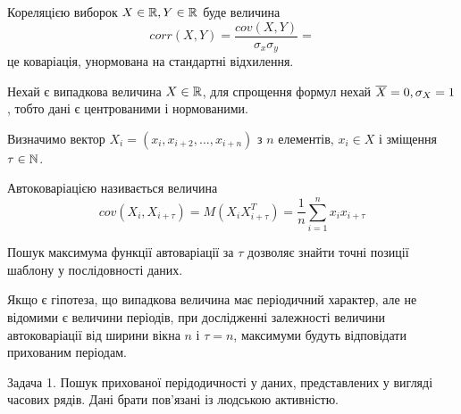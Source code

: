 \begin{ozn}
Кореляцією виборок $X \in \Bbb R, Y \in \Bbb R$ буде величина
\begin{equation}
corr(X,Y) = \frac{cov(X,Y)}{\sigma_x \sigma_y} = 
\end{equation}
це коваріація, унормована на стандартні відхилення.
\end{ozn}

Нехай є випадкова величина $X \in \Bbb R$, для спрощення формул нехай $\overline{X} = 0, \sigma_X = 1$, тобто дані є центрованими і нормованими. 

Визначимо вектор $X_i = (x_i, x_{i+2}, \ldots, x_{i+n}) $ з $n$ елементів, $ x_i \in X$ і зміщення $\tau \in \Bbb N$.

\begin{ozn}
Автоковаріацією називається величина 
\begin{equation}
cov(X_i, X_{i+\tau}) = M(X_iX_{i+\tau}^T) = \frac{1}{n} \sum_{i = 1}^{n} x_i x_{i+\tau}
\end{equation}
\end{ozn}

Пошук максимума функції автоваріації за $\tau$ дозволяє знайти точні позиції шаблону у послідовності даних. 

Якщо є гіпотеза, що випадкова величина має періодичний характер, але не відомими є величини періодів,
при дослідженні залежності величини автоковаріації від ширини вікна $n$ і $\tau = n$, максимуми будуть відповідати прихованим періодам.


Задача 1. Пошук прихованої перідодичності у даних, представлених у вигляді часових рядів. Дані брати пов'язані із людською активністю.

